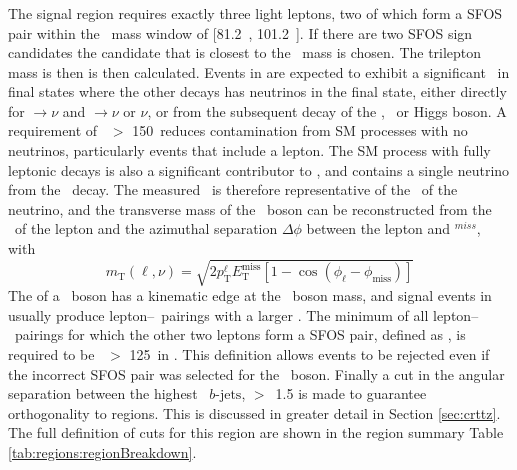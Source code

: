 \subsubsection{\SRThree}
\label{sec:srthree}
The signal region requires exactly three light leptons, two of which form a SFOS pair within the \Zboson\ mass window of [81.2~\gev, 101.2~\gev].
If there are two SFOS sign candidates the candidate that is closest to the \Zboson\ mass is chosen.
The trilepton mass \mZl is then is then calculated.
Events in \SRThree are expected to exhibit a significant \met\ in final states where the other \chono decays has neutrinos in the final state, either directly for \chone$\rightarrow$\Wboson$\nu$ and \none$\rightarrow$\Hboson$\nu$ or \Zboson$\nu$, or from the subsequent decay of the \Wboson , \Zboson\ or Higgs boson.
A requirement of \met\ $>$ 150~\GeV reduces contamination from SM processes with no neutrinos, particularly \Zjet events that include a \fake lepton.
The SM \WZ process with fully leptonic decays is also a significant contributor to \SRThree, and contains a single neutrino from the \Wboson\ decay.
The measured \met\ is therefore representative of the \pt\ of the neutrino, and the transverse mass \mT of the \Wboson\ boson can be reconstructed from the \pt\ of the lepton and the azimuthal separation $\Delta\phi$ between the lepton and \pt$^{miss}$, with
\begin{equation}
m_{\text{T}}(\ell,\nu) = \sqrt{2p_{\mathrm{T}}^\ell E_{\mathrm{T}}^{\mathrm{miss}}[1-\cos(\phi_{\ell}-\phi_{\mathrm{miss}})]}
\label{eq:mT}
\end{equation}
The \mT of a \Wboson\ boson has a kinematic edge at the \Wboson\ boson mass, and signal events in \SRThree usually produce lepton--\met\ pairings with a larger \mT.
The minimum \mT of all lepton--\met\ pairings for which the other two leptons form a SFOS pair, defined as \mTmin, is required to be \mTmin\ $>$ 125~\GeV in \SRThree.
This definition allows \WZ events to be rejected even if the incorrect SFOS pair was selected for the \Zboson\ boson.
Finally a cut in the angular separation between the highest \pt\ $b\textrm{-jets}$, \dRbb$>$~1.5 is made to guarantee orthogonality to \ttZ regions.
This is discussed in greater detail in Section \ref{sec:crttz}.
The full definition of cuts for this region are shown in the region summary Table \ref{tab:regions:regionBreakdown}.

